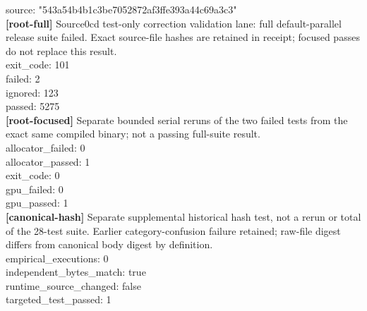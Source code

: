 \documentclass[11pt]{article}
\begin{document}
source: "543a54b4b1c3be7052872af3ffe393a44c69a3c3"\\
\textbf{[root-full]} Source0cd test-only correction validation lane: full default-parallel release suite failed. Exact source-file hashes are retained in receipt; focused passes do not replace this result.\\
exit\_code: 101\\
failed: 2\\
ignored: 123\\
passed: 5275\\
\textbf{[root-focused]} Separate bounded serial reruns of the two failed tests from the exact same compiled binary; not a passing full-suite result.\\
allocator\_failed: 0\\
allocator\_passed: 1\\
exit\_code: 0\\
gpu\_failed: 0\\
gpu\_passed: 1\\
\textbf{[canonical-hash]} Separate supplemental historical hash test, not a rerun or total of the 28-test suite. Earlier category-confusion failure retained; raw-file digest differs from canonical body digest by definition.\\
empirical\_executions: 0\\
independent\_bytes\_match: true\\
runtime\_source\_changed: false\\
targeted\_test\_passed: 1\\
\end{document}
